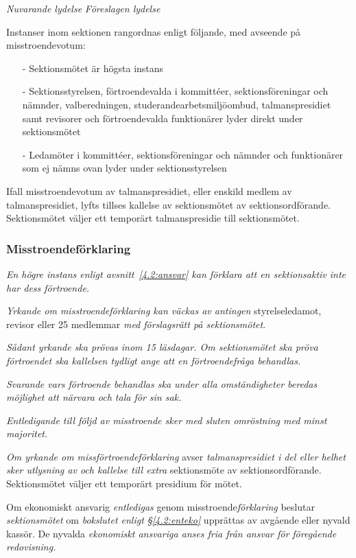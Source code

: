 \documentclass{article}
\newenvironment{lydelse}
    {\begin{paracol}{2}%
        \emph{Nuvarande lydelse}%
        \switchcolumn%
        \emph{Föreslagen lydelse}%
    \end{paracol}%
    \begin{enumerate}[label=\thesubsection.\arabic*]%
    \begin{paracol}{2}%
    }{\end{paracol}\end{enumerate}}
\begin{document}
\begin{lydelse}
	\item Instanser inom sektionen rangordnas enligt följande, med avseende på misstroendevotum:
  	  \begin{itemize}
  	    \item[-] Sektionsmötet är högsta instans
  		\item[-] Sektionsstyrelsen, förtroendevalda i kommittéer, sektionsföreningar och nämnder, valberedningen, studerandearbetsmiljöombud, talmanspresidiet samt revisorer och förtroendevalda funktionärer lyder direkt under sektionsmötet
  		\item[-] Ledamöter i kommittéer, sektionsföreningar och nämnder och funktionärer som ej nämns ovan lyder under sektionsstyrelsen
  	  \end{itemize}
	
  	\item Ifall misstroendevotum av talmanspresidiet, eller enskild medlem av talmanspresidiet, lyfts tillses kallelse av sektionsmötet av sektionsordförande. Sektionsmötet väljer ett temporärt talmanspresidie till sektionsmötet.

  \switchcolumn
    \subsubsection*{Misstroendeförklaring}
    \item \emph{En högre instans enligt avsnitt~\ref{4.2:ansvar} kan förklara att en sektionsaktiv inte har dess förtroende.}

    \item \emph{Yrkande om misstroendeförklaring kan väckas av antingen}
      styrelseledamot, revisor eller 25 medlemmar \emph{med förslagsrätt på sektionsmötet}.

    \item \emph{Sådant yrkande ska prövas inom 15 läsdagar.
    Om sektionsmötet ska pröva förtroendet ska kallelsen tydligt ange att en förtroendefråga behandlas.} \label{4.3:misstroende}

    \item \emph{Svarande vars förtroende behandlas ska under alla omständigheter beredas möjlighet att närvara och tala för sin sak.}

    \item \emph{Entledigande till följd av misstroende sker med sluten omröstning med minst  majoritet.} \label{maj:mi} 
     
    \item \emph{Om yrkande om missförtroendeförklaring} avser \emph{talmanspresidiet i del eller helhet sker utlysning av och kallelse till extra} sektionsmöte av sektionsordförande.
      Sektionsmötet väljer ett temporärt presidium för mötet.
    
    \item Om ekonomiskt ansvarig \emph{entledigas} genom misstroende\emph{förklaring} beslutar \emph{sektionsmötet} om \emph{bokslutet enligt \S\ref{4.2:enteko}} upprättas av avgående eller nyvald kassör. De nyvalda \emph{ekonomiskt ansvariga anses fria från ansvar för föregående redovisning.}
\end{lydelse}
\setcounter{subsection}{4}    
\end{document}
